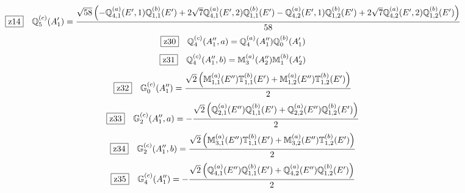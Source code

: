 \documentclass[fleqn,10pt,landscape]{jsarticle}
\begin{document}
\begin{dmath*}
\hspace*{3mm}\fbox{z14}\quad \mathbb{Q}_{5}^{(c)}(A_{1}^{\prime})=\frac{\sqrt{58} \left(- \mathbb{Q}_{4,1}^{(a)}(E^{\prime},1) \mathbb{Q}_{1,1}^{(b)}(E^{\prime}) + 2 \sqrt{7} \mathbb{Q}_{4,1}^{(a)}(E^{\prime},2) \mathbb{Q}_{1,1}^{(b)}(E^{\prime}) - \mathbb{Q}_{4,2}^{(a)}(E^{\prime},1) \mathbb{Q}_{1,2}^{(b)}(E^{\prime}) + 2 \sqrt{7} \mathbb{Q}_{4,2}^{(a)}(E^{\prime},2) \mathbb{Q}_{1,2}^{(b)}(E^{\prime})\right)}{58}
\end{dmath*}
\begin{dmath*}
\hspace*{3mm}\fbox{z30}\quad \mathbb{Q}_{4}^{(c)}(A_{1}^{\prime\prime},a)=\mathbb{Q}_{4}^{(a)}(A_{1}^{\prime\prime}) \mathbb{Q}_{0}^{(b)}(A_{1}^{\prime})
\end{dmath*}
\begin{dmath*}
\hspace*{3mm}\fbox{z31}\quad \mathbb{Q}_{4}^{(c)}(A_{1}^{\prime\prime},b)=\mathbb{M}_{3}^{(a)}(A_{2}^{\prime\prime}) \mathbb{M}_{1}^{(b)}(A_{2}^{\prime})
\end{dmath*}
\begin{dmath*}
\hspace*{3mm}\fbox{z32}\quad \mathbb{G}_{0}^{(c)}(A_{1}^{\prime\prime})=\frac{\sqrt{2} \left(\mathbb{M}_{1,1}^{(a)}(E^{\prime\prime}) \mathbb{T}_{1,1}^{(b)}(E^{\prime}) + \mathbb{M}_{1,2}^{(a)}(E^{\prime\prime}) \mathbb{T}_{1,2}^{(b)}(E^{\prime})\right)}{2}
\end{dmath*}
\begin{dmath*}
\hspace*{3mm}\fbox{z33}\quad \mathbb{G}_{2}^{(c)}(A_{1}^{\prime\prime},a)=- \frac{\sqrt{2} \left(\mathbb{Q}_{2,1}^{(a)}(E^{\prime\prime}) \mathbb{Q}_{1,1}^{(b)}(E^{\prime}) + \mathbb{Q}_{2,2}^{(a)}(E^{\prime\prime}) \mathbb{Q}_{1,2}^{(b)}(E^{\prime})\right)}{2}
\end{dmath*}
\begin{dmath*}
\hspace*{3mm}\fbox{z34}\quad \mathbb{G}_{2}^{(c)}(A_{1}^{\prime\prime},b)=\frac{\sqrt{2} \left(\mathbb{M}_{3,1}^{(a)}(E^{\prime\prime}) \mathbb{T}_{1,1}^{(b)}(E^{\prime}) + \mathbb{M}_{3,2}^{(a)}(E^{\prime\prime}) \mathbb{T}_{1,2}^{(b)}(E^{\prime})\right)}{2}
\end{dmath*}
\begin{dmath*}
\hspace*{3mm}\fbox{z35}\quad \mathbb{G}_{4}^{(c)}(A_{1}^{\prime\prime})=- \frac{\sqrt{2} \left(\mathbb{Q}_{4,1}^{(a)}(E^{\prime\prime}) \mathbb{Q}_{1,1}^{(b)}(E^{\prime}) + \mathbb{Q}_{4,2}^{(a)}(E^{\prime\prime}) \mathbb{Q}_{1,2}^{(b)}(E^{\prime})\right)}{2}
\end{dmath*}
\end{document}
